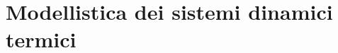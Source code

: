 \documentclass[../main.tex]{subfiles}
\begin{document}
\clearpage
\thispagestyle{empty}
\vspace*{7cm}
\section{Modellistica dei sistemi dinamici termici}
\vspace*{1.5cm}
\end{document}
